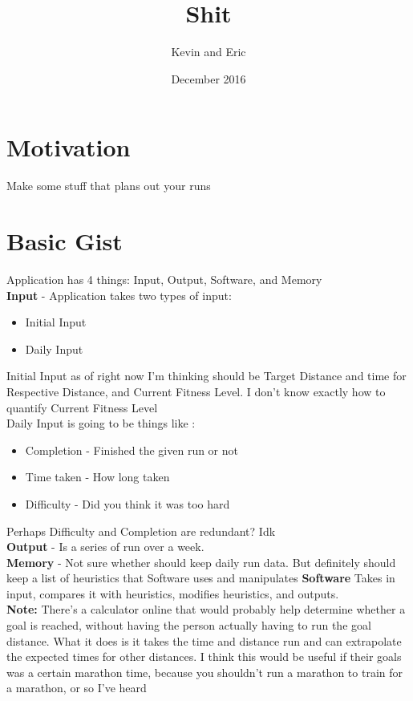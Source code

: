 \documentclass{article}
\title{Shit}
\author{Kevin and Eric }
\date{December 2016}
\begin{document}
\maketitle

\section{Motivation}
Make some stuff that plans out your runs 


\section{Basic Gist}
Application has 4 things: Input, Output, Software, and Memory\\
\indent \textbf{Input} - Application takes two types of input:
\begin{itemize}
\item Initial Input 
\item Daily Input
\end{itemize}
\indent Initial Input as of right now I'm thinking should be Target Distance and time for Respective Distance, and Current Fitness Level. I don't know exactly how to quantify Current Fitness Level \\
Daily Input is going to be things like :
\begin{itemize}
\item Completion - Finished the given run or not
\item Time taken - How long taken
\item Difficulty - Did you think it was too hard
\end{itemize}
Perhaps Difficulty and Completion are redundant? Idk\\
\indent \textbf{Output} - Is a series of run over a week.\\
\indent \textbf{Memory} - Not sure whether should keep daily run data. But definitely should keep a list of heuristics that Software uses and manipulates
\indent \textbf{Software} Takes in input, compares it with heuristics, modifies heuristics, and outputs.\\
\indent \textbf{Note:} There's a calculator online that would probably help determine whether a goal is reached, without having the person actually having to run the goal distance. What it does is it takes the time and distance run and can extrapolate the expected times for other distances. I think this would be useful if their goals was a certain marathon time, because you shouldn't run a marathon to train for a marathon, or so I've heard
\end{document}
